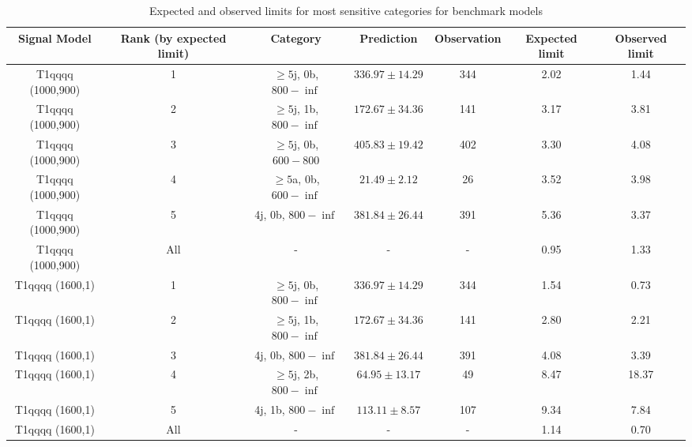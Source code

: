 \begin{landscape}
\begin{longtable}{ccccccc}
\caption{Expected and observed limits for most sensitive categories for benchmark models} \label{tab:benchMarkTable_T1qqqq} \\    \hline
Signal Model & Rank (by expected limit) & Category & Prediction & Observation & Expected limit & Observed limit\\ \hline
T1qqqq (1000,900) & 1 & $\ge5$j, 0b, $800-\inf$ & $336.97 \pm 14.29$ & 344 & 2.02 & 1.44\\ 
T1qqqq (1000,900) & 2 & $\ge5$j, 1b, $800-\inf$ & $172.67 \pm 34.36$ & 141 & 3.17 & 3.81\\ 
T1qqqq (1000,900) & 3 & $\ge5$j, 0b, $600-800$ & $405.83 \pm 19.42$ & 402 & 3.30 & 4.08\\ 
T1qqqq (1000,900) & 4 & $\ge5$a, 0b, $600-\inf$ & $21.49 \pm 2.12$ & 26 & 3.52 & 3.98\\ 
T1qqqq (1000,900) & 5 & 4j, 0b, $800-\inf$ & $381.84 \pm 26.44$ & 391 & 5.36 & 3.37\\ 
T1qqqq (1000,900) & All & - & - & - & 0.95 & 1.33\\ 
T1qqqq (1600,1) & 1 & $\ge5$j, 0b, $800-\inf$ & $336.97 \pm 14.29$ & 344 & 1.54 & 0.73\\ 
T1qqqq (1600,1) & 2 & $\ge5$j, 1b, $800-\inf$ & $172.67 \pm 34.36$ & 141 & 2.80 & 2.21\\ 
T1qqqq (1600,1) & 3 & 4j, 0b, $800-\inf$ & $381.84 \pm 26.44$ & 391 & 4.08 & 3.39\\ 
T1qqqq (1600,1) & 4 & $\ge5$j, 2b, $800-\inf$ & $64.95 \pm 13.17$ & 49 & 8.47 & 18.37\\ 
T1qqqq (1600,1) & 5 & 4j, 1b, $800-\inf$ & $113.11 \pm 8.57$ & 107 & 9.34 & 7.84\\ 
T1qqqq (1600,1) & All & - & - & - & 1.14 & 0.70\\ 
\hline
\hline
\end{longtable}
\end{landscape}
